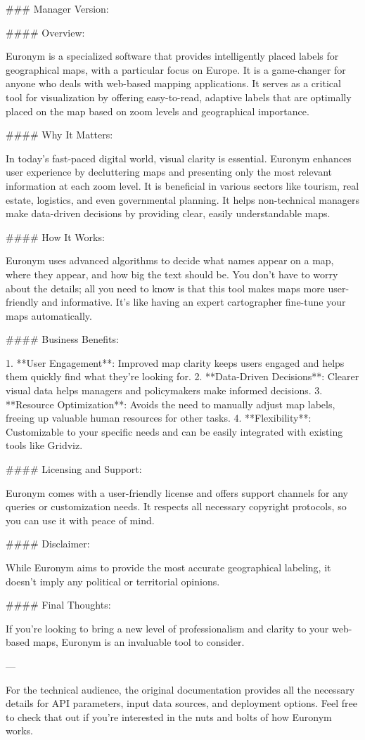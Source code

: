 ### Manager Version:

#### Overview:

Euronym is a specialized software that provides intelligently placed labels for geographical maps, with a particular focus on Europe. It is a game-changer for anyone who deals with web-based mapping applications. It serves as a critical tool for visualization by offering easy-to-read, adaptive labels that are optimally placed on the map based on zoom levels and geographical importance.

#### Why It Matters:

In today's fast-paced digital world, visual clarity is essential. Euronym enhances user experience by decluttering maps and presenting only the most relevant information at each zoom level. It is beneficial in various sectors like tourism, real estate, logistics, and even governmental planning. It helps non-technical managers make data-driven decisions by providing clear, easily understandable maps.

#### How It Works:

Euronym uses advanced algorithms to decide what names appear on a map, where they appear, and how big the text should be. You don't have to worry about the details; all you need to know is that this tool makes maps more user-friendly and informative. It’s like having an expert cartographer fine-tune your maps automatically.

#### Business Benefits:

1. **User Engagement**: Improved map clarity keeps users engaged and helps them quickly find what they're looking for.
2. **Data-Driven Decisions**: Clearer visual data helps managers and policymakers make informed decisions.
3. **Resource Optimization**: Avoids the need to manually adjust map labels, freeing up valuable human resources for other tasks.
4. **Flexibility**: Customizable to your specific needs and can be easily integrated with existing tools like Gridviz.

#### Licensing and Support:

Euronym comes with a user-friendly license and offers support channels for any queries or customization needs. It respects all necessary copyright protocols, so you can use it with peace of mind.

#### Disclaimer:

While Euronym aims to provide the most accurate geographical labeling, it doesn't imply any political or territorial opinions.

#### Final Thoughts:

If you’re looking to bring a new level of professionalism and clarity to your web-based maps, Euronym is an invaluable tool to consider.

---

For the technical audience, the original documentation provides all the necessary details for API parameters, input data sources, and deployment options. Feel free to check that out if you're interested in the nuts and bolts of how Euronym works.
